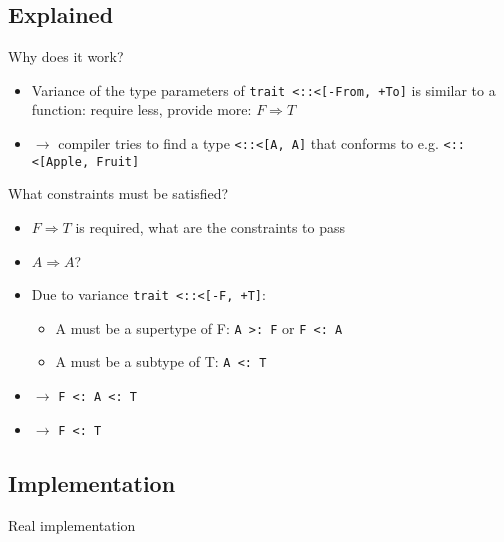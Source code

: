 \documentclass[11pt]{beamer}
\begin{document}
\subsection{Explained}
\begin{frame}{Why does it work?}
\begin{itemize}
\item Variance of the type parameters of 
\lstinline{trait <::<[-From, +To]} is similar to a function: require less, provide more: $F \Rightarrow T$ 
\item $\rightarrow$ compiler tries to find a type \lstinline{<::<[A, A]} that conforms to e.g. \lstinline{<::<[Apple, Fruit]} 
\end{itemize}
\end{frame}

\begin{frame}[fragile] {What constraints must be satisfied?}
\begin{itemize}
\item $F \Rightarrow T$ is required, what are the constraints to pass
\item $A \Rightarrow A$? \pause
\item Due to variance \lstinline{trait <::<[-F, +T]}:
\begin{itemize}
\item A must be a supertype of F: \lstinline{A >: F} or \lstinline{F <: A}
\item A must be a subtype of T: \lstinline{A <: T} 
\end{itemize}\pause
\item $\rightarrow$ \lstinline{F <: A <: T}  
\item $\rightarrow$ \lstinline{F <: T}  
\end{itemize}
\end{frame}

\subsection{Implementation}
\begin{frame}{Real implementation}
\end{frame}
\end{document}
